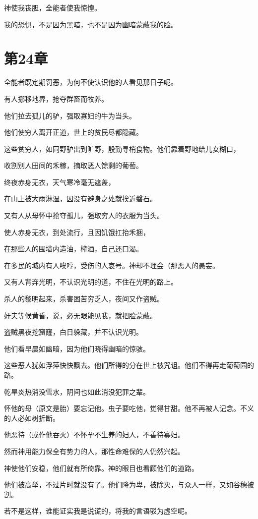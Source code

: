 \documentclass[12pt,oneside]{book}
\begin{document}
神使我丧胆，全能者使我惊惶。

我的恐惧，不是因为黑暗，也不是因为幽暗蒙蔽我的脸。


\chapter{第24章}
全能者既定期罚恶，为何不使认识他的人看见那日子呢。

有人挪移地界，抢夺群畜而牧养。

他们拉去孤儿的驴，强取寡妇的牛为当头。

他们使穷人离开正道，世上的贫民尽都隐藏。

这些贫穷人，如同野驴出到旷野，殷勤寻梢食物。他们靠着野地给儿女糊口，

收割别人田间的禾稼，摘取恶人馀剩的葡萄。

终夜赤身无衣，天气寒冷毫无遮盖，

在山上被大雨淋湿，因没有避身之处就挨近磐石。

又有人从母怀中抢夺孤儿，强取穷人的衣服为当头。

使人赤身无衣，到处流行，且因饥饿扛抬禾捆，

在那些人的围墙内造油，榨酒，自己还口渴。

在多民的城内有人唉哼，受伤的人哀号。神却不理会（那恶人的愚妄。

又有人背弃光明，不认识光明的道，不住在光明的路上。

杀人的黎明起来，杀害困苦穷乏人，夜间又作盗贼。

奸夫等候黄昏，说，必无眼能见我，就把脸蒙蔽。

盗贼黑夜挖窟窿，白日躲藏，并不认识光明。

他们看早晨如幽暗，因为他们晓得幽暗的惊骇。

这些恶人犹如浮萍快快飘去。他们所得的分在世上被咒诅。他们不得再走葡萄园的路。

乾旱炎热消没雪水，阴间也如此消没犯罪之辈。

怀他的母（原文是胎）要忘记他。虫子要吃他，觉得甘甜。他不再被人记念。不义的人必如树折断。

他恶待（或作他吞灭）不怀孕不生养的妇人，不善待寡妇。

然而神用能力保全有势力的人，那性命难保的人仍然兴起。

神使他们安稳，他们就有所倚靠。神的眼目也看顾他们的道路。

他们被高举，不过片时就没有了。他们降为卑，被除灭，与众人一样，又如谷穗被割。

若不是这样，谁能证实我是说谎的，将我的言语驳为虚空呢。
\end{document}
